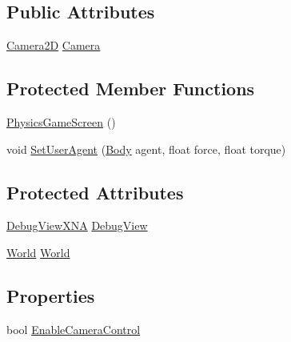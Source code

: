 \subsection*{Public Attributes}
\begin{DoxyCompactItemize}
\item 
\hyperlink{classgearit_1_1xna_1_1_camera2_d}{Camera2\+D} \hyperlink{classgearit_1_1xna_1_1_physics_game_screen_aed6fb58ffb825763a6f785c3ffea0c36}{Camera}
\end{DoxyCompactItemize}
\subsection*{Protected Member Functions}
\begin{DoxyCompactItemize}
\item 
\hyperlink{classgearit_1_1xna_1_1_physics_game_screen_a3e80e155535c159fd6b55e4cb0afaf42}{Physics\+Game\+Screen} ()
\item 
void \hyperlink{classgearit_1_1xna_1_1_physics_game_screen_a45d956c0d109d7a21da1172d0c79978b}{Set\+User\+Agent} (\hyperlink{class_farseer_physics_1_1_dynamics_1_1_body}{Body} agent, float force, float torque)
\end{DoxyCompactItemize}
\subsection*{Protected Attributes}
\begin{DoxyCompactItemize}
\item 
\hyperlink{class_farseer_physics_1_1_debug_views_1_1_debug_view_x_n_a}{Debug\+View\+X\+N\+A} \hyperlink{classgearit_1_1xna_1_1_physics_game_screen_ae0567f5ebb324f6f711f9a669a25d10a}{Debug\+View}
\item 
\hyperlink{class_farseer_physics_1_1_dynamics_1_1_world}{World} \hyperlink{classgearit_1_1xna_1_1_physics_game_screen_a077b075ebe915c9d1270fb11fed0ce72}{World}
\end{DoxyCompactItemize}
\subsection*{Properties}
\begin{DoxyCompactItemize}
\item 
bool \hyperlink{classgearit_1_1xna_1_1_physics_game_screen_af257434a4a106ea94c3cdb9706ce86f1}{Enable\+Camera\+Control}
\end{DoxyCompactItemize}


